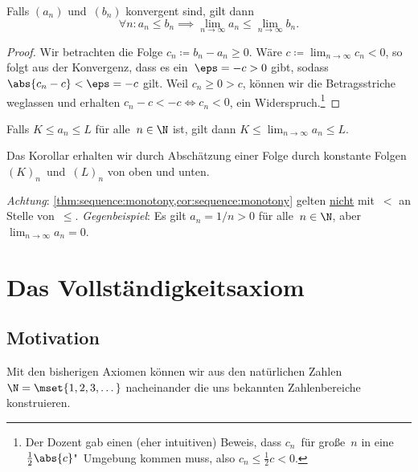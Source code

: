\documentclass[a4paper]{article}
\begin{document}
\begin{theorem}\label{thm:sequence:monotony}
    Falls $(a_n)$ und~$(b_n)$ konvergent sind, gilt dann
    \begin{equation*}
        \forall n\colon a_n \leq b_n \implies \lim_{n\to\infty} a_n \leq \lim_{n\to\infty} b_n.
    \end{equation*}
\end{theorem}

\begin{proof}
    Wir betrachten die Folge $c_n \coloneqq b_n - a_n \geq 0$. Wäre $c \coloneqq \lim_{n\to\infty} c_n < 0$, so folgt aus der Konvergenz, dass es ein~$\eps = -c > 0$ gibt, sodass $\abs{c_n-c} < \eps = -c$ gilt. Weil $c_n \geq 0 > c$, können wir die Betragsstriche weglassen und erhalten $c_n-c < -c \iff c_n < 0$, ein Widerspruch.\footnote{Der Dozent gab einen (eher intuitiven) Beweis, dass $c_n$~für große~$n$ in eine $\frac{1}{2}\abs{c}$"~Umgebung kommen muss, also $c_n \leq \frac{1}{2}c < 0$.}
\end{proof}

\begin{corollary}\label{cor:sequence:monotony}
    Falls $K \leq a_n \leq L$ für alle~$n \in \N$ ist, gilt dann $K \leq \lim_{n\to\infty} a_n \leq L$.
\end{corollary}

Das Korollar erhalten wir durch Abschätzung einer Folge durch konstante Folgen $(K)_n$~und~$(L)_n$ von oben und unten.

\emph{Achtung}: \cref{thm:sequence:monotony,cor:sequence:monotony} gelten \underline{nicht} mit~$<$ an Stelle von~$\leq$. \emph{Gegenbeispiel}: Es gilt $a_n = 1/n > 0$ für alle~$n \in \N$, aber $\lim_{n\to\infty} a_n = 0$.


\section{Das Vollständigkeitsaxiom}

\subsection{Motivation}

Mit den bisherigen Axiomen können wir aus den natürlichen Zahlen~$\N = \mset{1, 2, 3, \dots}$ nacheinander die uns bekannten Zahlenbereiche konstruieren.
\end{document}
